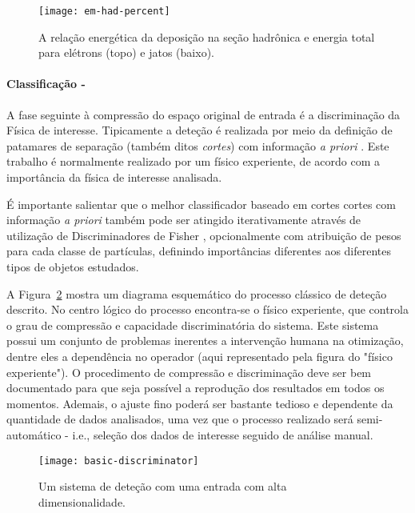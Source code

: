 \begin{figure}
\begin{center}
\texttt{[image: em-had-percent]}
\end{center}
\caption{A relação energética da deposição na seção hadrônica e energia total para
elétrons (topo) e jatos (baixo).}
\label{fig:e-jet-deposit}
\end{figure}

\paragraph{Classificação -} A fase seguinte à compressão do espaço original
de entrada é a discriminação da Física de interesse. Tipicamente
\cite{hlt-tdr, zeus-neural} a deteção é realizada por meio da definição de
patamares de separação (também ditos \emph{cortes}) com informação \emph{a
priori} \cite{vantrees}. Este trabalho é normalmente realizado por um físico
experiente, de acordo com a importância da física de interesse analisada. 

É importante salientar que o melhor classificador baseado em cortes cortes com
informação \emph{a priori} também pode ser atingido iterativamente através de
utilização de Discriminadores de Fisher \cite{haykin-adaptative},
opcionalmente com atribuição de pesos para cada classe de partículas,
definindo importâncias diferentes aos diferentes tipos de objetos estudados.

A Figura~\ref{fig:basic-discriminator} mostra um diagrama esquemático do
processo clássico de deteção descrito. No centro lógico do processo
encontra-se o físico experiente, que controla o grau de compressão e
capacidade discriminatória do sistema. Este sistema possui um conjunto de
problemas inerentes a intervenção humana na otimização, dentre eles a
dependência no operador (aqui representado pela figura do "físico
experiente"). O procedimento de compressão e discriminação deve ser bem
documentado para que seja possível a reprodução dos resultados em todos os
momentos. Ademais, o ajuste fino poderá ser bastante tedioso e dependente da
quantidade de dados analisados, uma vez que o processo realizado será
semi-automático - i.e., seleção dos dados de interesse seguido de análise
manual.

\begin{figure}
\begin{center}
\texttt{[image: basic-discriminator]}
\end{center}
\caption{Um sistema  de deteção com uma entrada com alta
dimensionalidade.}
\label{fig:basic-discriminator}
\end{figure}

